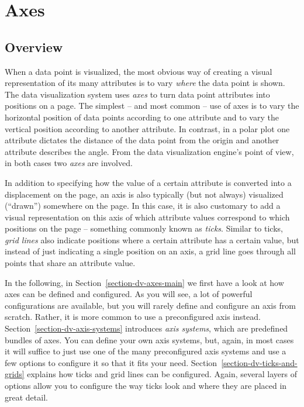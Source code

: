 %
%
%


\section{Axes}
\label{section-dv-axes}

\subsection{Overview}

When a data point is visualized, the most obvious way of creating a visual
representation of its many attributes is to vary \emph{where} the data point is
shown. The data visualization system uses \emph{axes} to turn data point
attributes into positions on a page. The simplest -- and most common -- use of
axes is to vary the horizontal position of data points according to one
attribute and to vary the vertical position according to another attribute. In
contrast, in a polar plot one attribute dictates the distance of the data point
from the origin and another attribute describes the angle. From the data
visualization engine's point of view, in both cases two \emph{axes} are
involved.

In addition to specifying how the value of a certain attribute is converted
into a displacement on the page, an axis is also typically (but not always)
visualized (``drawn'') somewhere on the page. In this case, it is also
customary to add a visual representation on this axis of which attribute values
correspond to which positions on the page -- something commonly known as
\emph{ticks}. Similar to ticks, \emph{grid lines} also indicate positions where
a certain attribute has a certain value, but instead of just indicating a
single position on an axis, a grid line goes through all points that share an
attribute value.

In the following, in Section~\ref{section-dv-axes-main} we first have a look at
how axes can be defined and configured. As you will see, a lot of powerful
configurations are available, but you will rarely define and configure an axis
from scratch. Rather, it is more common to use a preconfigured axis instead.
Section~\ref{section-dv-axis-systems} introduces \emph{axis systems}, which are
predefined bundles of axes. You can define your own axis systems, but, again,
in most cases it will suffice to just use one of the many preconfigured axis
systems and use a few options to configure it so that it fits your need.
Section~\ref{section-dv-ticks-and-grids} explains how ticks and grid lines can
be configured. Again, several layers of options allow you to configure the way
ticks look and where they are placed in great detail.

